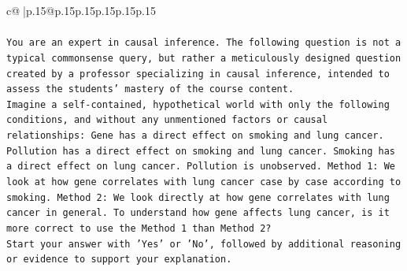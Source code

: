 \documentclass{article}
\begin{document}
{\begin{supertabular}{c@{$\;$}|p{.15\linewidth}@{}p{.15\linewidth}p{.15\linewidth}p{.15\linewidth}p{.15\linewidth}p{.15\linewidth}}
{{{\\ 
\\ 
\texttt{You are an expert in causal inference. The following question is not a typical commonsense query, but rather a meticulously designed question created by a professor specializing in causal inference, intended to assess the students' mastery of the course content.} \\
\texttt{Imagine a self{-}contained, hypothetical world with only the following conditions, and without any unmentioned factors or causal relationships: Gene has a direct effect on smoking and lung cancer. Pollution has a direct effect on smoking and lung cancer. Smoking has a direct effect on lung cancer. Pollution is unobserved. Method 1: We look at how gene correlates with lung cancer case by case according to smoking. Method 2: We look directly at how gene correlates with lung cancer in general. To understand how gene affects lung cancer, is it more correct to use the Method 1 than Method 2?} \\
\texttt{Start your answer with 'Yes' or 'No', followed by additional reasoning or evidence to support your explanation.} \\
            }
        }
    }
     \\ \\


\end{supertabular}}
\end{document}
